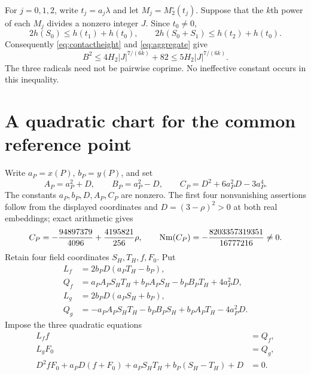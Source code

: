 \documentclass[11pt,a4paper]{article}
\begin{document}
For $j=0,1,2$, write $t_j=a_j\lambda$ and let $M_j=M_2^\circ(t_j)$.
Suppose that the $k$th power of each $M_j$ divides a nonzero integer
$J$. Since $t_0\ne0$,
\[
 2h(S_0)\le h(t_1)+h(t_0),\qquad
 2h(S_0+S_1)\le h(t_2)+h(t_0).
\]
Consequently \eqref{eq:contactheight} and \eqref{eq:aggregate} give
\begin{equation}\label{eq:heighttransfer}
 B^2\le4H_2|J|^{7/(6k)}+82
             \le5H_2|J|^{7/(6k)}.
\end{equation}
The three radicals need not be pairwise coprime. No ineffective
constant occurs in this inequality.

\section{A quadratic chart for the common reference point}

Write $a_P=x(P)$, $b_P=y(P)$, and set
\[
 A_P=a_P^2+D,\qquad B_P=a_P^2-D,\qquad
 C_P=D^2+6a_P^2D-3a_P^4.
\]
The constants $a_P,b_P,D,A_P,C_P$ are nonzero. The first four
nonvanishing assertions follow from the displayed coordinates and
$D=(3-\rho)^2>0$ at both real embeddings; exact arithmetic gives
\[
 C_P=-\frac{94897379}{4096}+\frac{4195821}{256}\rho,
 \qquad \operatorname{Nm}(C_P)=-\frac{8203357319351}{16777216}\ne0.
\]
Retain four field coordinates $S_H,T_H,f,F_0$. Put
\begin{align*}
 L_f&=2b_PD(a_PT_H-b_P),\\
 Q_f&=a_PA_P S_H T_H+b_PA_P S_H-b_PB_PT_H+4a_P^2D,\\
 L_g&=2b_PD(a_P S_H+b_P),\\
 Q_g&=-a_PA_P S_H T_H-b_PB_P S_H+b_PA_PT_H-4a_P^2D.
\end{align*}
Impose the three quadratic equations
\begin{equation}\label{eq:Hchart}
 \begin{split}
 L_ff&=Q_f,\\
 L_gF_0&=Q_g,\\
 D^2fF_0+a_PD(f+F_0)+a_PS_HT_H+b_P(S_H-T_H)+D&=0.
 \end{split}
\end{equation}
\end{document}
